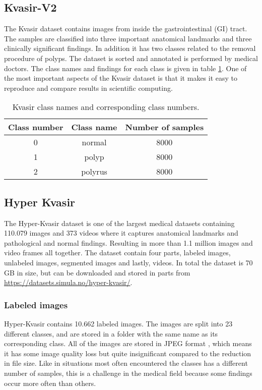\documentclass[thesis.tex]{subfiles}
\begin{document}
\subsection{Kvasir-V2} \label{sec:kvasir-v2}
The Kvasir dataset \cite{KVASIRMultiClass17} contains images from inside the gastrointestinal (GI) tract. The samples are classified into three important anatomical landmarks and three clinically significant findings. In addition it has two classes related to the removal procedure of polyps. The dataset is sorted and annotated is performed by medical doctors. The class names and findings for each class is given in table \ref{table:kvasir}. One of the most important aspects of the Kvasir dataset is that it makes it easy to reproduce and compare results in scientific computing.

\begin{table}
  \centering
  \begin{tabular}{ |c|c|c| }
  	\hline
  	Class number & Class name & Number of samples \\
    \hline
    0 & normal & 8000 \\ 
    1 & polyp & 8000 \\ 
    2 & polyrus & 8000 \\ 
    \hline
  \end{tabular}
  \caption{Kvasir class names and corresponding class numbers.}
  \label{table:kvasir}
\end{table}


\subsection{Hyper Kvasir} \label{sec:hyper_kvasir}
The Hyper-Kvasir dataset \cite{HyperKvasirComprehensive19} is one of the largest medical datasets containing 110.079 images and 373 videos where it captures anatomical landmarks and pathological and normal findings. Resulting in more than 1.1 million images and video frames all together. The dataset contain four parts, labeled images, unlabeled images, segmented images and lastly, videos. In total the dataset is 70 GB in size, but can be downloaded and stored in parts from \url{https://datasets.simula.no/hyper-kvasir/}.


\subsubsection{Labeled images}
Hyper-Kvasir contains 10.662 labeled images. The images are split into 23 different classes, and are stored in a folder with the same name as its corresponding class. All of the images are stored in JPEG format \cite{JPEGStill92}, which means it has some image quality loss but quite insignificant compared to the reduction in file size. Like in situations most often encountered the classes has a different number of samples, this is a challenge in the medical field because some findings occur more often than others.
\end{document}
